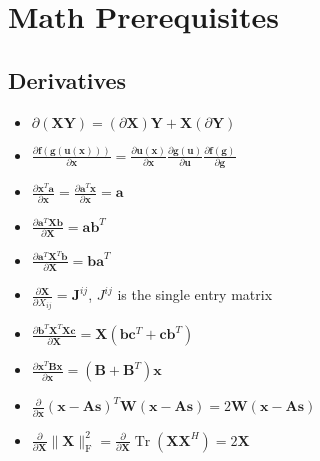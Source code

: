 
\section{Math Prerequisites}

\subsection{Derivatives }

\begin{itemize}
    \item $\partial ( \mathbf { X } \mathbf { Y } ) = ( \partial \mathbf { X } ) \mathbf { Y } + \mathbf { X } ( \partial \mathbf { Y } )$
    \item $\frac { \partial \mathbf { f } ( \mathbf { g } ( \mathbf { u } ( \mathbf { x } ) ) ) } { \partial \mathbf { x } } = \frac { \partial \mathbf { u } ( \mathbf { x } ) } { \partial \mathbf { x } } \frac { \partial \mathbf { g } ( \mathbf { u } ) } { \partial \mathbf { u } } \frac { \partial \mathbf { f } ( \mathbf { g } ) } { \partial \mathbf { g } }$
	\item $\frac { \partial \mathbf { x } ^ { T } \mathbf { a } } { \partial \mathbf { x } } = \frac { \partial \mathbf { a } ^ { T } \mathbf { x } } { \partial \mathbf { x } } = \mathbf { a }$
	\item $\frac { \partial \mathbf { a } ^ { T } \mathbf { X } \mathbf { b } } { \partial \mathbf { X } } = \mathbf { a b } ^ { T }$
	\item $\frac { \partial \mathbf { a } ^ { T } \mathbf { X } ^ { T } \mathbf { b } } { \partial \mathbf { X } } = \mathbf { b a } ^ { T }$
	\item $\frac { \partial \mathbf { X } } { \partial X _ { i j } } = \mathbf { J } ^ { i j }$, $J^{ij}$ is the single entry matrix
	\item $\frac { \partial \mathbf { b } ^ { T } \mathbf { X } ^ { T } \mathbf { X } \mathbf { c } } { \partial \mathbf { X } } = \mathbf { X } \left( \mathbf { b } \mathbf { c } ^ { T } + \mathbf { c b } ^ { T } \right)$
	\item $\frac { \partial \mathbf { x } ^ { T } \mathbf { B } \mathbf { x } } { \partial \mathbf { x } } = \left( \mathbf { B } + \mathbf { B } ^ { T } \right) \mathbf { x }$
	\item $\frac { \partial } { \partial \mathbf { x } } ( \mathbf { x } - \mathbf { A } \mathbf { s } ) ^ { T } \mathbf { W } ( \mathbf { x } - \mathbf { A } \mathbf { s } ) = 2 \mathbf { W } ( \mathbf { x } - \mathbf { A } \mathbf { s } )$
	\item $\frac { \partial } { \partial \mathbf { X } } \| \mathbf { X } \| _ { \mathrm { F } } ^ { 2 } = \frac { \partial } { \partial \mathbf { X } } \operatorname { Tr } \left( \mathbf { X } \mathbf { X } ^ { H } \right) = 2 \mathbf { X }$
\end{itemize}

